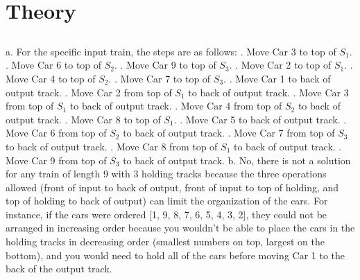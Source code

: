 \documentclass{article}
\title{Data Structures: Problem Set #2}
\author{Jackie Luo}
\date{February 27, 2015}
\begin{document}
\maketitle

\section{Theory}

\subsection{}
a. For the specific input train, the steps are as follows:
\newline
{}. Move Car 3 to top of $S_{1}$.
. Move Car 6 to top of $S_{2}$.
. Move Car 9 to top of $S_{3}$.
. Move Car 2 to top of $S_{1}$.
. Move Car 4 to top of $S_{2}$.
. Move Car 7 to top of $S_{3}$.
. Move Car 1 to back of output track.
. Move Car 2 from top of $S_{1}$ to back of output track.
. Move Car 3 from top of $S_{1}$ to back of output track.
. Move Car 4 from top of $S_{2}$ to back of output track.
. Move Car 8 to top of $S_{1}$.
. Move Car 5 to back of output track.
. Move Car 6 from top of $S_{2}$ to back of output track.
. Move Car 7 from top of $S_{3}$ to back of output track.
. Move Car 8 from top of $S_{1}$ to back of output track.
. Move Car 9 from top of $S_{3}$ to back of output track.
\newline
\newline
b. No, there is not a solution for any train of length 9 with 3 holding tracks because the three operations allowed (front of input to back of output, front of input to top of holding, and top of holding to back of output) can limit the organization of the cars. For instance, if the cars were ordered [1, 9, 8, 7, 6, 5, 4, 3, 2], they could not be arranged in increasing order because you wouldn't be able to place the cars in the holding tracks in decreasing order (smallest numbers on top, largest on the bottom), and you would need to hold all of the cars before moving Car 1 to the back of the output track.
\end{document}

